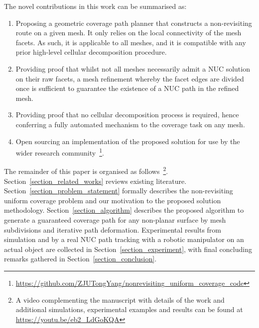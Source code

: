 \documentclass[lettersize,journal]{IEEEtran}
\begin{document}

The novel contributions in this work can be summarised as: 
\begin{enumerate}
\item Proposing a geometric coverage path planner that constructs a non-revisiting route on a given mesh. 
It only relies on the local connectivity of the mesh facets. As such, it is applicable to all meshes, and it is compatible with any prior high-level cellular decomposition procedure. 
\item Providing proof that whilst not all meshes necessarily admit a NUC solution on their raw facets, a mesh refinement whereby the facet edges are divided once is sufficient to guarantee
the existence of a NUC path in the refined mesh. 
\item Providing proof that no cellular decomposition process is required, hence conferring a fully automated mechanism to the coverage task on any mesh. 
\item Open sourcing an implementation of the proposed solution for use by the wider research community~\footnote{\url{https://github.com/ZJUTongYang/nonrevisiting_uniform_coverage_code}}. 
\end{enumerate}

The remainder of this paper is organised as follows~\footnote{A video complementing the manuscript with details of the work and additional simulations, experimental examples and results can be found at \\\url{https://youtu.be/eb2_LdGoKQA}}. 
Section~\ref{section_related_works} reviews existing literature. 
Section~\ref{section_problem_statement} formally describes the non-revisiting uniform coverage problem and our motivation to the proposed solution methodology. 
Section~\ref{section_algorithm} describes the proposed algorithm to generate a guaranteed coverage path for any non-planar surface by mesh subdivisions and iterative path deformation. 
Experimental results from simulation and by a real NUC path tracking with a robotic manipulator on an actual object are collected in Section~\ref{section_experiment}, with final concluding remarks gathered in Section~\ref{section_conclusion}. 
\end{document}
